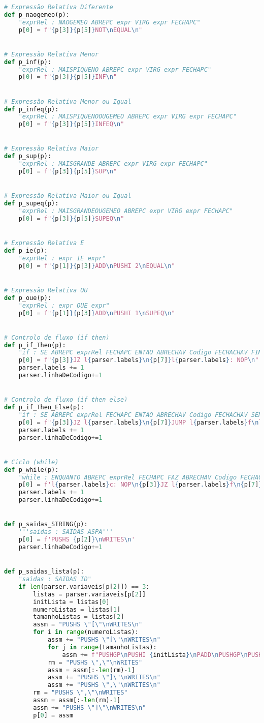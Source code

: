 \documentclass[11pt,a4paper]{report}%
\begin{document}
\begin{scriptsize}
\begin{lstlisting}[language=python]
# Expressão Relativa Diferente
def p_naogemeo(p):
    "exprRel : NAOGEMEO ABREPC expr VIRG expr FECHAPC"
    p[0] = f"{p[3]}{p[5]}NOT\nEQUAL\n"


# Expressão Relativa Menor
def p_inf(p):
    "exprRel : MAISPIQUENO ABREPC expr VIRG expr FECHAPC"
    p[0] = f"{p[3]}{p[5]}INF\n"


# Expressão Relativa Menor ou Igual
def p_infeq(p):
    "exprRel : MAISPIQUENOOUGEMEO ABREPC expr VIRG expr FECHAPC"
    p[0] = f"{p[3]}{p[5]}INFEQ\n"


# Expressão Relativa Maior
def p_sup(p):
    "exprRel : MAISGRANDE ABREPC expr VIRG expr FECHAPC"
    p[0] = f"{p[3]}{p[5]}SUP\n"


# Expressão Relativa Maior ou Igual
def p_supeq(p):
    "exprRel : MAISGRANDEOUGEMEO ABREPC expr VIRG expr FECHAPC"
    p[0] = f"{p[3]}{p[5]}SUPEQ\n"


# Expressão Relativa E
def p_ie(p):
    "exprRel : expr IE expr"
    p[0] = f"{p[1]}{p[3]}ADD\nPUSHI 2\nEQUAL\n"


# Expressão Relativa OU
def p_oue(p):
    "exprRel : expr OUE expr"
    p[0] = f"{p[1]}{p[3]}ADD\nPUSHI 1\nSUPEQ\n"


# Controlo de fluxo (if then)
def p_if_Then(p):
    "if : SE ABREPC exprRel FECHAPC ENTAO ABRECHAV Codigo FECHACHAV FIM"
    p[0] = f"{p[3]}JZ l{parser.labels}\n{p[7]}l{parser.labels}: NOP\n"
    parser.labels += 1
    parser.linhaDeCodigo+=1


# Controlo de fluxo (if then else)
def p_if_Then_Else(p):
    "if : SE ABREPC exprRel FECHAPC ENTAO ABRECHAV Codigo FECHACHAV SENAO ABRECHAV Codigo FECHACHAV FIM"
    p[0] = f"{p[3]}JZ l{parser.labels}\n{p[7]}JUMP l{parser.labels}f\nl{parser.labels}: NOP\n{p[11]}l{parser.labels}f: NOP\n"
    parser.labels += 1
    parser.linhaDeCodigo+=1


# Ciclo (while)
def p_while(p):
    "while : ENQUANTO ABREPC exprRel FECHAPC FAZ ABRECHAV Codigo FECHACHAV FIM"
    p[0] = f'l{parser.labels}c: NOP\n{p[3]}JZ l{parser.labels}f\n{p[7]}JUMP l{parser.labels}c\nl{parser.labels}f: NOP\n'
    parser.labels += 1
    parser.linhaDeCodigo+=1


def p_saidas_STRING(p):
    '''saidas : SAIDAS ASPA'''
    p[0] = f'PUSHS {p[2]}\nWRITES\n'
    parser.linhaDeCodigo+=1


def p_saidas_lista(p):
    "saidas : SAIDAS ID"
    if len(parser.variaveis[p[2]]) == 3:
        listas = parser.variaveis[p[2]]
        initLista = listas[0]
        numeroListas = listas[1]
        tamanhoListas = listas[2]
        assm = "PUSHS \"[\"\nWRITES\n"
        for i in range(numeroListas):
            assm += "PUSHS \"[\"\nWRITES\n"
            for j in range(tamanhoListas):
                assm += f"PUSHGP\nPUSHI {initLista}\nPADD\nPUSHGP\nPUSHI {i}\nPUSHI {tamanhoListas}\nMUL\nPADD\nPUSHI {j}\nLOADN\nWRITEI\nPOP 1\nPUSHS \",\"\nWRITES\n"
            rm = "PUSHS \",\"\nWRITES"
            assm = assm[:-len(rm)-1]
            assm += "PUSHS \"]\"\nWRITES\n"
            assm += "PUSHS \",\"\nWRITES\n"
        rm = "PUSHS \",\"\nWRITES"
        assm = assm[:-len(rm)-1]
        assm += "PUSHS \"]\"\nWRITES\n"
        p[0] = assm


\end{lstlisting}
\end{scriptsize}
\end{document}
